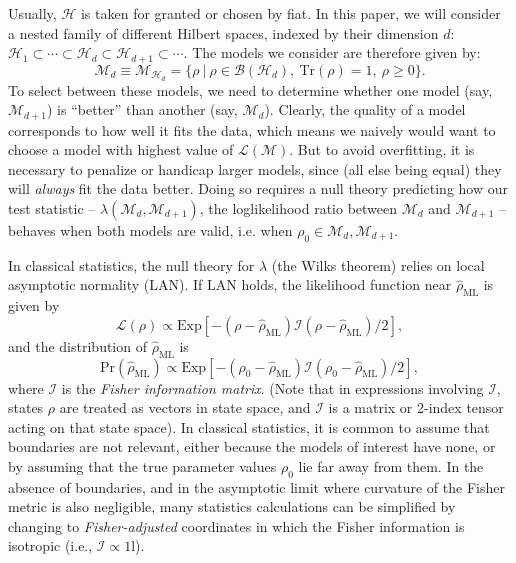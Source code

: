 \documentclass[aps,pra, twocolumn]{revtex4-1}
\newcommand{\M}{\mathcal{M}}
\newcommand{\cH}{\mathcal{H}}
\newcommand{\cL}{\mathcal{L}}
\newcommand{\Id}{\mathbb{I}}
\def\Id{1\!\mathrm{l}}
\newcommand{\rhohat}{\hat{\rho}}
\begin{document}
Usually, $\cH$ is taken for granted or chosen by fiat.  In this paper, we will consider a nested family of different Hilbert spaces, indexed by their dimension $d$: $\cH_{1}  \subset \cdots \subset \cH_{d} \subset \cH_{d+1} \subset \cdots$.  The models we consider are therefore given by:
\begin{equation}
\M_{d} \equiv \mathcal{M}_{\cH_{d}} = \{\rho~|~\rho \in \mathcal{B}(\mathcal{H}_{d}),~\mathrm{Tr}(\rho) =1,~\rho \geq 0\}.
\end{equation}
To select between these models, we need to determine whether one model (say, $\M_{d + 1}$) is ``better'' than another (say, $\M_{d}$).  Clearly, the quality of a model corresponds to how well it fits the data, which means we naively would want to choose a model with highest value of $\cL(\M)$.  But to avoid overfitting, it is necessary to penalize or handicap larger models, since (all else being equal) they will \emph{always} fit the data better.  Doing so requires a null theory predicting how our test statistic -- $\lambda(\M_{d}, \M_{d+1})$, the loglikelihood ratio between $\M_d$ and $\M_{d+1}$ -- behaves when both models are valid, i.e. when $\rho_{0} \in \M_{d},\M_{d + 1}$.

In classical statistics, the null theory for $\lambda$ (the Wilks theorem) relies on local asymptotic normality (LAN).  If LAN holds, the likelihood function near $\rhohat_{\mathrm{ML}}$ is given by
\begin{equation}
\mathcal{L}(\rho) \propto \text{Exp}\left[-(\rho - \rhohat_{\mathrm{ML}})\mathcal{I}(\rho - \rhohat_{\mathrm{ML}})/2\right],
\end{equation}
and the distribution of $\rhohat_{\mathrm{ML}}$ is
\begin{equation}
\mathrm{Pr}(\rhohat_{\mathrm{ML}}) \propto \text{Exp}\left[-(\rho_{0} - \rhohat_{\mathrm{ML}})\mathcal{I}(\rho_{0} - \rhohat_{\mathrm{ML}})/2\right],
\end{equation}
where $\mathcal{I}$ is the \emph{Fisher information matrix}.  (Note that in expressions involving $\mathcal{I}$, states $\rho$ are treated as vectors in state space, and $\mathcal{I}$ is a matrix or 2-index tensor acting on that state space).  In classical statistics, it is common to assume that boundaries are not relevant, either because the models of interest have none, or by assuming that the true parameter values $\rho_{0}$ lie far away from them.  In the absence of boundaries, and in the asymptotic limit where curvature of the Fisher metric is also negligible, many statistics calculations can be simplified by changing to \emph{Fisher-adjusted} coordinates in which the Fisher information is isotropic (i.e., $\mathcal{I}\propto\Id$).
\end{document}
